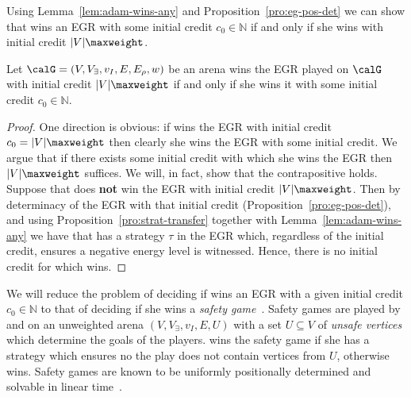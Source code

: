 \documentclass[a4paper]{article}
\begin{document}
Using Lemma~\ref{lem:adam-wins-any} and Proposition~\ref{pro:eg-pos-det} we can
show that \eve wins an EGR with some initial credit $c_0 \in \mathbb{N}$ if and
only if she wins with initial credit $|V|\maxweight$.
\begin{proposition}\label{pro:enough-credit}
	Let $\calG = (V,V_\exists,v_I,E,E_\rho,w)$ be an arena
	\eve wins the EGR played on $\calG$ with initial credit
	$|V|\maxweight$ if and only if she wins it with some initial credit $c_0
	\in \mathbb{N}$.
\end{proposition}
\begin{proof}
	One direction is obvious: if \eve wins the EGR with initial credit $c_0 =
	|V|\maxweight$ then clearly she wins the EGR with some initial credit. We
	argue that if there exists some initial credit with which she wins the
	EGR then $|V|\maxweight$ suffices. We will, in fact, show that the
	contrapositive holds. Suppose that \eve does \textbf{not} win the EGR
	with initial credit $|V|\maxweight$. Then by determinacy of the EGR
	with that initial credit (Proposition~\ref{pro:eg-pos-det}), and using
	Proposition~\ref{pro:strat-transfer} together with
	Lemma~\ref{lem:adam-wins-any} we have that \adam has a strategy $\tau$
	in the EGR which, regardless of the initial credit, ensures a negative
	energy level is witnessed. Hence, there is no initial credit for which
	\eve wins.
\end{proof}

 We will reduce the problem of
deciding if \eve wins an EGR with a given initial credit $c_0 \in \mathbb{N}$ to
that of deciding if she wins a \emph{safety game}~\cite{ag11}. Safety games are
played by \eve and \adam on an unweighted arena $(V,V_\exists,v_I,E,U)$ with a
set $U \subseteq V$ of \emph{unsafe vertices} which determine
the goals of the players. \eve wins the safety game if she has a strategy which
ensures no the play does not contain vertices from $U$, otherwise \adam
wins. Safety games are known to be uniformly positionally determined and
solvable in linear time~\cite{ag11}.
\end{document}
